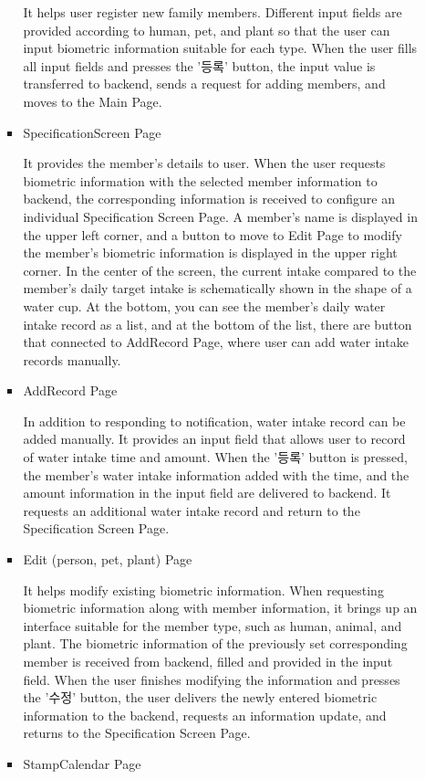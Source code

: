 \documentclass[conference]{IEEEtran}
\begin{document}
\begin{itemize}
\begin{enumerate}
\begin{itemize}
            It helps user register new family members. Different input fields are provided according to human, pet, and plant so that the user can input biometric information suitable for each type. When the user fills all input fields and presses the '등록' button, the input value is transferred to backend, sends a request for adding members, and moves to the Main Page.
            \item SpecificationScreen Page
            \setlength{\parindent}{2ex}
            
            It provides the member's details to user. When the user requests biometric information with the selected member information to backend, the corresponding information is received to configure an individual Specification Screen Page. A member's name is displayed in the upper left corner, and a button to move to Edit Page to modify the member's biometric information is displayed in the upper right corner. In the center of the screen, the current intake compared to the member's daily target intake is schematically shown in the shape of a water cup. At the bottom, you can see the member's daily water intake record as a list, and at the bottom of the list, there are button that connected to AddRecord Page, where user can add water intake records manually.
            \item AddRecord Page
            \setlength{\parindent}{2ex}
            
            In addition to responding to notification, water intake record can be added manually. It provides an input field that allows user to record of water intake time and amount. When the '등록' button is pressed, the member's water intake information added with the time, and the amount information in the input field are delivered to backend. It requests an additional water intake record and return to the Specification Screen Page.
            \item Edit (person, pet, plant) Page
            \setlength{\parindent}{2ex}
            
            It helps modify existing biometric information. When requesting biometric information along with member information, it brings up an interface suitable for the member type, such as human, animal, and plant. The biometric information of the previously set corresponding member is received from backend, filled and provided in the input field. When the user finishes modifying the information and presses the '수정' button, the user delivers the newly entered biometric information to the backend, requests an information update, and returns to the Specification Screen Page.
            \item StampCalendar Page 
            \setlength{\parindent}{2ex}
            

\end{itemize}
\end{enumerate}
\end{itemize}
\end{document}
